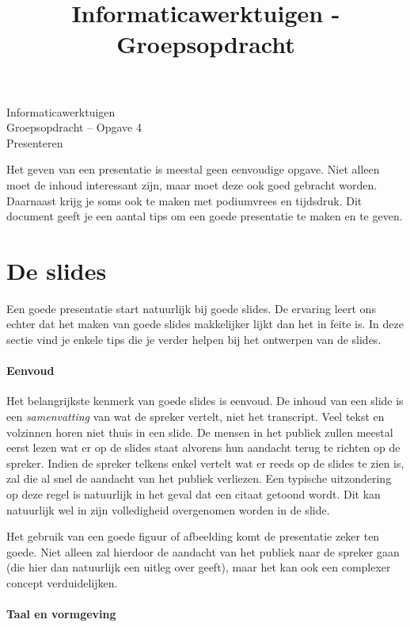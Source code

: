\documentclass[a4paper]{article}
\title{Informaticawerktuigen - Groepsopdracht}
\begin{document}
\begin{center}
  \huge Informaticawerktuigen \\
  \Huge Groepsopdracht -- Opgave 4 \\
  \huge Presenteren
\end{center}
\vspace{1em}

Het geven van een presentatie is meestal geen eenvoudige opgave.
Niet alleen moet de inhoud interessant zijn, maar moet deze ook goed gebracht worden.
Daarnaast krijg je soms ook te maken met podiumvrees en tijdsdruk.
Dit document geeft je een aantal tips om een goede presentatie te maken en te geven.


\section{De slides}

Een goede presentatie start natuurlijk bij goede slides.
De ervaring leert ons echter dat het maken van goede slides makkelijker lijkt dan het in feite is.
In deze sectie vind je enkele tips die je verder helpen bij het ontwerpen van de slides.


\paragraph{Eenvoud}

Het belangrijkste kenmerk van goede slides is eenvoud.
De inhoud van een slide is een \textit{samenvatting} van wat de spreker vertelt, niet het transcript.
Veel tekst en volzinnen horen niet thuis in een slide.
De mensen in het publiek zullen meestal eerst lezen wat er op de slides staat alvorens hun aandacht terug te richten op de spreker.
Indien de spreker telkens enkel vertelt wat er reeds op de slides te zien is, zal die al snel de aandacht van het publiek verliezen.
Een typische uitzondering op deze regel is natuurlijk in het geval dat een citaat getoond wordt.
Dit kan natuurlijk wel in zijn volledigheid overgenomen worden in de slide.

Het gebruik van een goede figuur of afbeelding komt de presentatie zeker ten goede.
Niet alleen zal hierdoor de aandacht van het publiek naar de spreker gaan (die hier dan natuurlijk een uitleg over geeft), maar het kan ook een complexer concept verduidelijken.


\paragraph{Taal en vormgeving}
\end{document}
